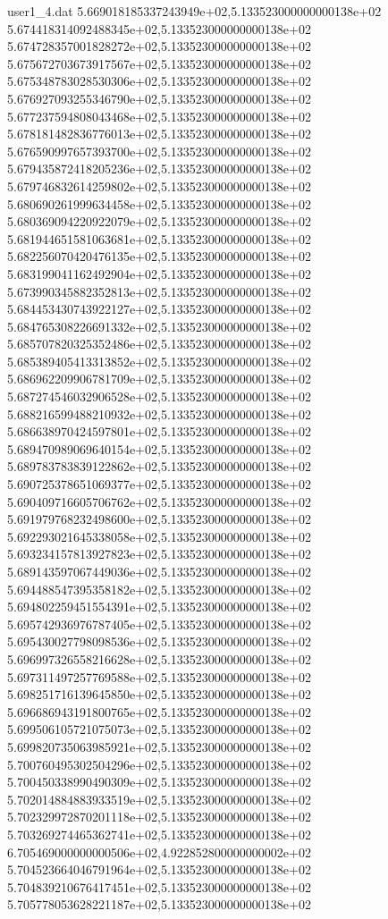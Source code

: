\begin{filecontents}{user1_4.dat}
5.669018185337243949e+02,5.133523000000000138e+02
5.674418314092488345e+02,5.133523000000000138e+02
5.674728357001828272e+02,5.133523000000000138e+02
5.675672703673917567e+02,5.133523000000000138e+02
5.675348783028530306e+02,5.133523000000000138e+02
5.676927093255346790e+02,5.133523000000000138e+02
5.677237594808043468e+02,5.133523000000000138e+02
5.678181482836776013e+02,5.133523000000000138e+02
5.676590997657393700e+02,5.133523000000000138e+02
5.679435872418205236e+02,5.133523000000000138e+02
5.679746832614259802e+02,5.133523000000000138e+02
5.680690261999634458e+02,5.133523000000000138e+02
5.680369094220922079e+02,5.133523000000000138e+02
5.681944651581063681e+02,5.133523000000000138e+02
5.682256070420476135e+02,5.133523000000000138e+02
5.683199041162492904e+02,5.133523000000000138e+02
5.673990345882352813e+02,5.133523000000000138e+02
5.684453430743922127e+02,5.133523000000000138e+02
5.684765308226691332e+02,5.133523000000000138e+02
5.685707820325352486e+02,5.133523000000000138e+02
5.685389405413313852e+02,5.133523000000000138e+02
5.686962209906781709e+02,5.133523000000000138e+02
5.687274546032906528e+02,5.133523000000000138e+02
5.688216599488210932e+02,5.133523000000000138e+02
5.686638970424597801e+02,5.133523000000000138e+02
5.689470989069640154e+02,5.133523000000000138e+02
5.689783783839122862e+02,5.133523000000000138e+02
5.690725378651069377e+02,5.133523000000000138e+02
5.690409716605706762e+02,5.133523000000000138e+02
5.691979768232498600e+02,5.133523000000000138e+02
5.692293021645338058e+02,5.133523000000000138e+02
5.693234157813927823e+02,5.133523000000000138e+02
5.689143597067449036e+02,5.133523000000000138e+02
5.694488547395358182e+02,5.133523000000000138e+02
5.694802259451554391e+02,5.133523000000000138e+02
5.695742936976787405e+02,5.133523000000000138e+02
5.695430027798098536e+02,5.133523000000000138e+02
5.696997326558216628e+02,5.133523000000000138e+02
5.697311497257769588e+02,5.133523000000000138e+02
5.698251716139645850e+02,5.133523000000000138e+02
5.696686943191800765e+02,5.133523000000000138e+02
5.699506105721075073e+02,5.133523000000000138e+02
5.699820735063985921e+02,5.133523000000000138e+02
5.700760495302504296e+02,5.133523000000000138e+02
5.700450338990490309e+02,5.133523000000000138e+02
5.702014884883933519e+02,5.133523000000000138e+02
5.702329972870201118e+02,5.133523000000000138e+02
5.703269274465362741e+02,5.133523000000000138e+02
6.705469000000000506e+02,4.922852800000000002e+02
5.704523664046791964e+02,5.133523000000000138e+02
5.704839210676417451e+02,5.133523000000000138e+02
5.705778053628221187e+02,5.133523000000000138e+02

\end{filecontents}
